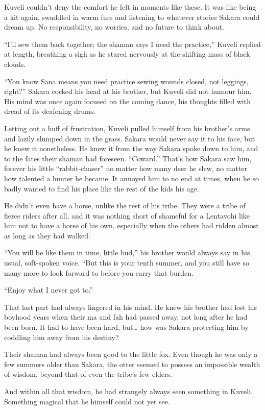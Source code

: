 Kuveli couldn't deny the comfort he felt in moments like these. It was like being a kit again, swaddled in warm furs and listening to whatever stories Sakara could dream up. No responsibility, no worries, and no future to think about.

``I'll sew them back together; the shaman says I need the practice,'' Kuveli replied at length, breathing a sigh as he stared nervously at the shifting mass of black clouds.

``You know Sana means you need practice sewing wounds closed, not leggings, right?'' Sakara cocked his head at his brother, but Kuveli did not humour him. His mind was once again focused on the coming dance, his thoughts filled with dread of its deafening drums.

Letting out a huff of frustration, Kuveli pulled himself from his brother's arms and lazily slumped down in the grass. Sakara would never say it to his face, but he knew it nonetheless. He knew it from the way Sakara spoke down to him, and to the fates their shaman had foreseen. ``Coward.'' That's how Sakara saw him, forever his little ``rabbit-chaser'' no matter how many deer he slew, no matter how talented a hunter he became. It annoyed him to no end at times, when he so badly wanted to find his place like the rest of the kids his age.

He didn't even have a horse, unlike the rest of his tribe. They were a tribe of fierce riders after all, and it was nothing short of shameful for a Lentavohi like him not to have a horse of his own, especially when the others had ridden almost as long as they had walked.

``You will be like them in time, little bud,'' his brother would always say in his usual, soft-spoken voice. ``But this is your tenth summer, and you still have so many more to look forward to before you carry that burden.

``Enjoy what I never got to.''

That last part had always lingered in his mind. He knew his brother had lost his boyhood years when their ma and fah had passed away, not long after he had been born. It had to have been hard, but\ldots{} how was Sakara protecting him by coddling him away from his destiny?

Their shaman had always been good to the little fox. Even though he was only a few summers older than Sakara, the otter seemed to possess an impossible wealth of wisdom, beyond that of even the tribe's few elders.

And within all that wisdom, he had strangely always seen something in Kuveli. Something magical that he himself could not yet see.


